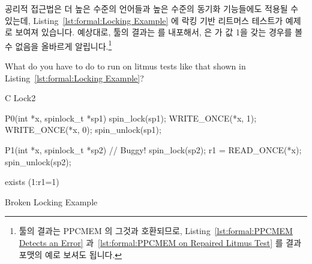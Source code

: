 공리적 접근법은 더 높은 수준의 언어들과 높은 수준의 동기화 기능들에도 적용될 수
있는데, Listing~\ref{lst:formal:Locking Example} 에 락킹 기반 리트머스 테스트가
예제로 보여져 있습니다.
예상대로,  툴의 결과는  를 내포해서,  은  가
값 1을 갖는 경우를 볼 수 없음을 올바르게 알립니다.\footnote{
	 툴의 결과는 PPCMEM 의 그것과 호환되므로,
	Listing~\ref{lst:formal:PPCMEM Detects an Error}
	과~\ref{lst:formal:PPCMEM on Repaired Litmus Test} 를 결과 포맷의 예로
	보셔도 됩니다.}
\iffalse

Axiomatic approaches may also be applied to higher-level
languages and also to higher-level synchronization primitives, as
exemplified by the lock-based litmus test shown in
Listing~\ref{lst:formal:Locking Example}.
As expected, the \co{herd} tool's output features the string \co{Never},
correctly indicating that \co{P1()} cannot see \co{x} having a value
of one.\footnote{
	The output of the \co{herd} tool is compatible with that
	of PPCMEM, so feel free to look at
	Listings~\ref{lst:formal:PPCMEM Detects an Error}
	and~\ref{lst:formal:PPCMEM on Repaired Litmus Test}
	for examples showing the output format.}
\fi

\QuickQuiz{}
	What do you have to do to run  on litmus tests like
	that shown in Listing~\ref{lst:formal:Locking Example}?
 \QuickQuizEnd

\begin{listing}[tb]
\begin{linelabel}
\begin{VerbatimL}[commandchars=\\\[\]]
C Lock2

{
}

P0(int *x, spinlock_t *sp1)
{
	spin_lock(sp1);
	WRITE_ONCE(*x, 1);
	WRITE_ONCE(*x, 0);
	spin_unlock(sp1);
}

P1(int *x, spinlock_t *sp2) // Buggy!
{
	spin_lock(sp2);
	r1 = READ_ONCE(*x);
	spin_unlock(sp2);
}

exists (1:r1=1)
\end{VerbatimL}
\end{linelabel}
\caption{Broken Locking Example}
\label{lst:formal:Broken Locking Example}
\end{listing}

